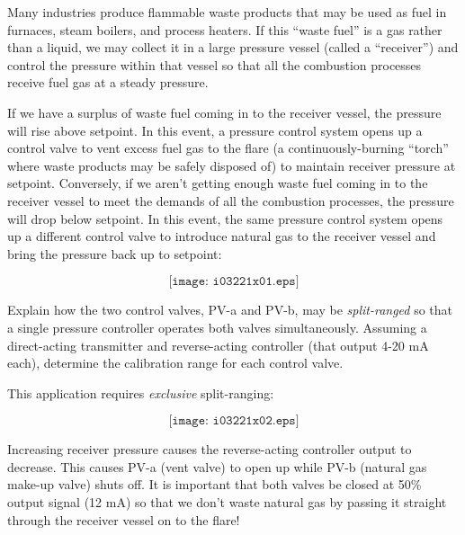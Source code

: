 

Many industries produce flammable waste products that may be used as fuel in furnaces, steam boilers, and process heaters.  If this ``waste fuel'' is a gas rather than a liquid, we may collect it in a large pressure vessel (called a ``receiver'') and control the pressure within that vessel so that all the combustion processes receive fuel gas at a steady pressure.  

If we have a surplus of waste fuel coming in to the receiver vessel, the pressure will rise above setpoint.  In this event, a pressure control system opens up a control valve to vent excess fuel gas to the flare (a continuously-burning ``torch'' where waste products may be safely disposed of) to maintain receiver pressure at setpoint.  Conversely, if we aren't getting enough waste fuel coming in to the receiver vessel to meet the demands of all the combustion processes, the pressure will drop below setpoint.  In this event, the same pressure control system opens up a different control valve to introduce natural gas to the receiver vessel and bring the pressure back up to setpoint:

$$\texttt{[image: i03221x01.eps]}$$

Explain how the two control valves, PV-a and PV-b, may be {\it split-ranged} so that a single pressure controller operates both valves simultaneously.  Assuming a direct-acting transmitter and reverse-acting controller (that output 4-20 mA each), determine the calibration range for each control valve.







This application requires {\it exclusive} split-ranging:

$$\texttt{[image: i03221x02.eps]}$$
 






Increasing receiver pressure causes the reverse-acting controller output to decrease.  This causes PV-a (vent valve) to open up while PV-b (natural gas make-up valve) shuts off.  It is important that both valves be closed at 50\% output signal (12 mA) so that we don't waste natural gas by passing it straight through the receiver vessel on to the flare!




